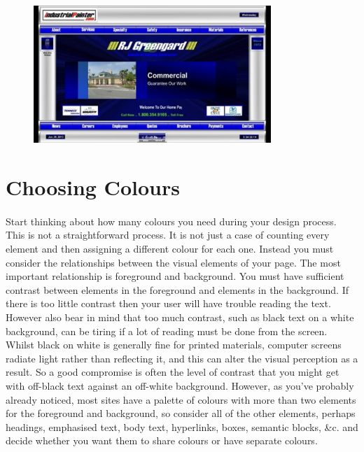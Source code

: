 \begin{figure}[H]
    \centering
    \includegraphics[width=0.8\textwidth]{figures/bad-colours_blue-background-2}
    \label{fig:bad-colours_blue-background-2}
    \caption{}
\end{figure}



\section{Choosing Colours}
\paragraph{} Start thinking about how many colours you need during your design process. This is not a straightforward process. It is not just a case of counting every element and then assigning a different colour for each one. Instead you must consider the relationships between the visual elements of your page. The most important relationship is foreground and background. You must have sufficient contrast between elements in the foreground and elements in the background. If there is too little contrast then your user will have trouble reading the text. However also bear in mind that too much contrast, such as black text on a white background, can be tiring if a lot of reading must be done from the screen. Whilst black on white is generally fine for printed materials, computer screens radiate light rather than reflecting it, and this can alter the visual perception as a result. So a good compromise is often the level of contrast that you might get with off-black text against an off-white background. However, as you've probably already noticed, most sites have a palette of colours with more than two elements for the foreground and background, so consider all of the other elements, perhaps headings, emphasised text, body text, hyperlinks, boxes, semantic blocks, \&c. and decide whether you want them to share colours or have separate colours.
